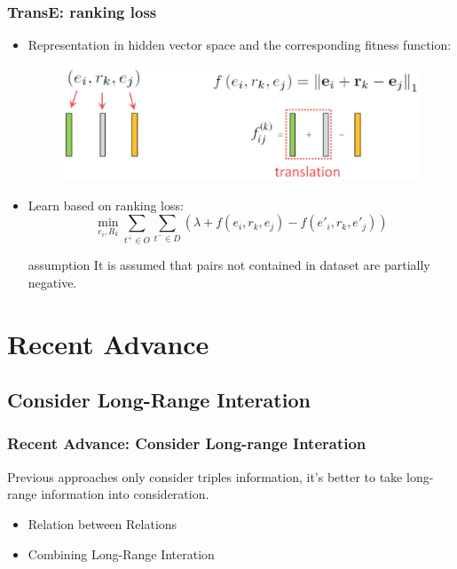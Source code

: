 \documentclass[pdf,10pt]{beamer}
\begin{document}
\begin{frame}
\frametitle{TransE: ranking loss}
\begin{itemize}
	\item Representation in hidden vector space and the corresponding fitness function:
		\begin{figure}
			\includegraphics[height=0.20\textwidth]{6.eps}
		\end{figure}
	\item Learn based on ranking loss:
		$$\min_{e_i,R_k}\sum_{t^+ \in O}\sum_{t^- \in D}{(\lambda + f(e_i,r_k,e_j) - f(e'_i,r_k,e'_j))}$$
	\begin{exampleblock}{assumption}
		It is assumed that pairs not contained in dataset are partially negative.
	\end{exampleblock}
\end{itemize}
\end{frame}

\section{Recent Advance}

\subsection{Consider Long-Range Interation}
\begin{frame}
\frametitle{Recent Advance: Consider Long-range Interation}
	Previous approaches only consider triples information, it's better to take long-range information into consideration.
	\begin{itemize}
		\item Relation between Relations \citep{bowman2014recursive}
		\item Combining Long-Range Interation \citep{wu2015structured}
	\end{itemize}
\end{frame}
\end{document}
